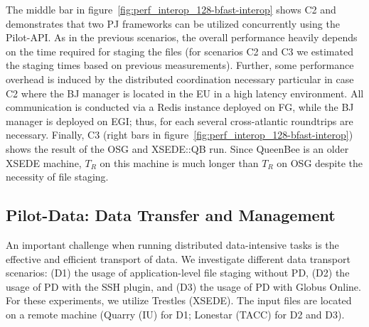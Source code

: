 \documentclass[conference]{IEEEtran}
\begin{document}


The middle bar in figure~\ref{fig:perf_interop_128-bfast-interop}
shows C2 and demonstrates that two PJ frameworks can be utilized
concurrently using the Pilot-API. As in the previous scenarios, the
overall performance heavily depends on the time required for staging
the files (for scenarios C2 and C3 we estimated the staging times
based on previous measurements). Further, some performance overhead is
induced by the distributed coordination necessary particular in case
C2 where the BJ manager is located in the EU in a high latency
environment.  All communication is conducted via a Redis instance
deployed on FG, while the BJ manager is deployed on EGI; thus, for
each \cu several cross-atlantic roundtrips are necessary.
Finally, C3 (right bars in
figure~\ref{fig:perf_interop_128-bfast-interop}) shows the result of
the OSG and XSEDE::QB run. Since QueenBee is an older XSEDE machine,
$T_R$ on this machine is much longer than $T_R$ on OSG despite the
necessity of file staging.


\subsection{Pilot-Data: Data Transfer and Management}
\label{sec:experiment-pilotdata}

  An important challenge when running distributed data-intensive
tasks is the effective and efficient transport of data. We investigate
different data transport scenarios: (D1) the usage of
application-level file staging without PD, (D2) the usage of PD with
the SSH plugin, and (D3)
the usage of PD with Globus Online. For these experiments, we utilize
Trestles (XSEDE). The input files are located on a remote machine 
(Quarry (IU) for D1; Lonestar (TACC) for D2 and D3).
\end{document}
